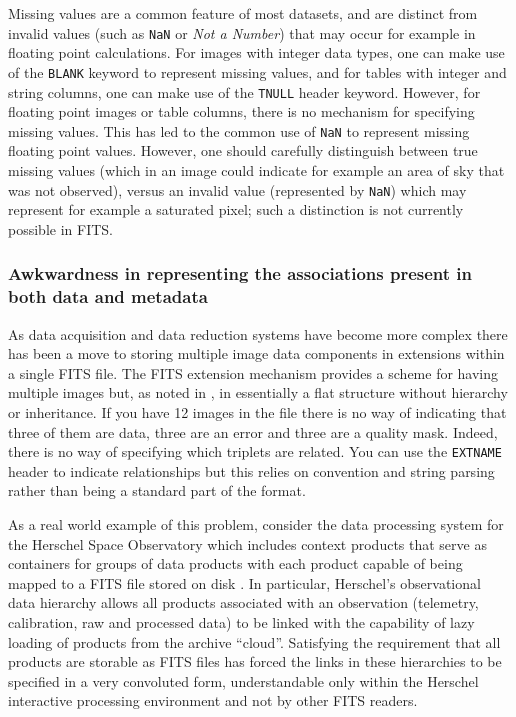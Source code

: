 \documentclass[final,authoryear,5p,times,twocolumn]{elsarticle}
\begin{document}
{{Missing values are a common feature of most datasets, and are distinct from
invalid values (such as \texttt{NaN} or \textit{Not a Number}) that may occur
for example in floating point calculations. For images with integer data
types, one can make use of the \texttt{BLANK} keyword to represent missing
values, and for tables with integer and string columns, one can make use of
the \texttt{TNULL} header keyword. However, for floating point images or
table columns, there is no mechanism for specifying missing values. This has
led to the common use of \texttt{NaN} to represent missing floating point
values. However, one should carefully distinguish between true missing values
(which in an image could indicate for example an area of sky that was not
observed), versus an invalid value (represented by \texttt{NaN}) which may
represent for example a saturated pixel; such a distinction is not currently possible
in FITS.


\subsubsection{Awkwardness in representing the associations present in both data and metadata}
\label{section_associations}


As data acquisition and data reduction systems have become more
complex there has been a move to storing multiple image data
components in extensions within a single FITS file. The FITS extension
mechanism provides a scheme for having multiple images but, as noted
in \citet{2003ASSL..285...71G}, in essentially a flat structure
without hierarchy or inheritance. If you have 12 images in the file
there is no way of indicating that three of them are data, three are an error
and three are a quality mask. Indeed, there is no way of specifying which
triplets are related. You can use the \texttt{EXTNAME} header to
indicate relationships but this relies on convention and string
parsing rather than being a standard part of the format.


As a real world example of this problem, consider the data processing
system for the Herschel Space Observatory which includes
context products that serve as containers for groups of data products
with each product capable of being mapped to a
FITS file stored on disk
\citep[see the Herschel architecture and design document;][]{2008HerschelDesign}.
In particular, Herschel's observational data
hierarchy allows all products associated with an observation (telemetry,
calibration, raw and processed data) to be linked with the capability of
lazy loading of products from the archive ``cloud''.
Satisfying the requirement that all products are storable as FITS files
has forced the links in these hierarchies to be specified in a very
convoluted form, understandable only within the
Herschel interactive processing environment
\citep[HIPE;][]{2010ASPC..434..139O} and not by other FITS readers.


}}
\end{document}
